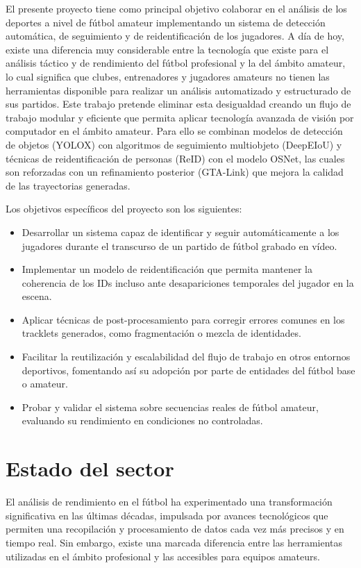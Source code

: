 \documentclass[12pt, a4paper, twoside]{article}
\begin{document}
	El presente proyecto tiene como principal objetivo colaborar en el análisis de los deportes a nivel de fútbol amateur implementando un sistema de detección automática, de seguimiento y de reidentificación de los jugadores. A día de hoy, existe una diferencia muy considerable entre la tecnología que existe para el análisis táctico y de rendimiento del fútbol profesional y la del ámbito amateur, lo cual significa que clubes, entrenadores y jugadores amateurs no tienen las herramientas disponible para realizar un análisis automatizado y estructurado de sus partidos.
	Este trabajo pretende eliminar esta desigualdad creando un flujo de trabajo modular y eficiente que permita aplicar tecnología avanzada de visión por computador en el ámbito amateur. Para ello se combinan modelos de detección de objetos (YOLOX) con algoritmos de seguimiento multiobjeto (DeepEIoU) y técnicas de reidentificación de personas (ReID) con el modelo OSNet, las cuales son reforzadas con un refinamiento posterior (GTA-Link) que mejora la calidad de las trayectorias generadas.
	
	Los objetivos específicos del proyecto son los siguientes:
	
	\begin{itemize}
		\item Desarrollar un sistema capaz de identificar y seguir automáticamente a los jugadores durante el transcurso de un partido de fútbol grabado en vídeo.
		\item Implementar un modelo de reidentificación que permita mantener la coherencia de los IDs incluso ante desapariciones temporales del jugador en la escena.
		\item Aplicar técnicas de post-procesamiento para corregir errores comunes en los tracklets generados, como fragmentación o mezcla de identidades.
		\item Facilitar la reutilización y escalabilidad del flujo de trabajo en otros entornos deportivos, fomentando así su adopción por parte de entidades del fútbol base o amateur.
		\item Probar y validar el sistema sobre secuencias reales de fútbol amateur, evaluando su rendimiento en condiciones no controladas.
	\end{itemize}

	
	\section{Estado del sector}
	
	El análisis de rendimiento en el fútbol ha experimentado una transformación significativa en las últimas décadas, impulsada por avances tecnológicos que permiten una recopilación y procesamiento de datos cada vez más precisos y en tiempo real. Sin embargo, existe una marcada diferencia entre las herramientas utilizadas en el ámbito profesional y las accesibles para equipos amateurs.
	
\end{document}
